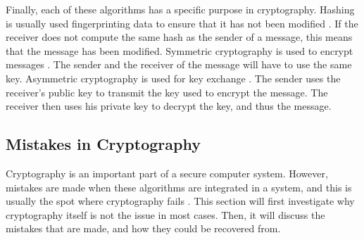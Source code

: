 \documentclass{l4proj}
\begin{document}
Finally, each of these algorithms has a specific purpose in cryptography.
Hashing is usually used fingerprinting data to ensure that it has not been modified \citep{kessler_overview_2016}.
If the receiver does not compute the same hash as the sender of a message, 
this means that the message has been modified. 
Symmetric cryptography is used to encrypt messages \citep{kessler_overview_2016}. 
The sender and the receiver of the message will have to use the same key.
Asymmetric cryptography is used for key exchange \citep{kessler_overview_2016}.
The sender uses the receiver's public key to transmit the key used to encrypt the message.
The receiver then uses his private key to decrypt the key, and thus the message.

\subsection{Mistakes in Cryptography}

Cryptography is an important part of a secure computer system. However, mistakes are made when these algorithms are integrated in a system,
and this is usually the spot where cryptography fails \citep{lazar_why_nodate}. This section will first investigate why cryptography itself is not the issue in most cases.
Then, it will discuss the mistakes that are made, and how they could be recovered from.
\end{document}
